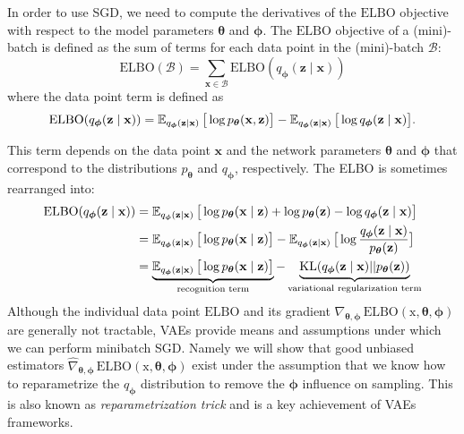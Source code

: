 In order to use SGD, we need to compute the derivatives of the $\mathrm{ELBO}$ objective with respect to the model parameters ${\boldsymbol{\theta}}$ and ${\boldsymbol{\phi}}$. 
The $\mathrm{ELBO}$ objective of a (mini)-batch is defined as the sum of terms for each data point in the (mini)-batch $\mathcal{B}$:
$$
\mathrm{ELBO}(\mathcal{B}) = \sum_{\mathbf{x} \in \mathcal{B}} \mathrm{ELBO}(q_{\boldsymbol{\phi}}(\mathbf{z}\mid \mathbf{x}))
$$
where the data point term is defined as
$$
\mathrm{ELBO}(q_{\boldsymbol{\phi}}(\mathbf{z}\mid \mathbf{x})) = \operatorname{\mathbb{E}}_{q_{\boldsymbol{\phi}}(\mathbf{z}\mid \mathbf{x})} \big[\log p_{\boldsymbol{\theta}}(\mathbf{x},\mathbf{z})\big] - \operatorname{\mathbb{E}}_{q_{\boldsymbol{\phi}}(\mathbf{z}\mid \mathbf{x})} \big[\log q_{\boldsymbol{\phi}}(\mathbf{z}\mid \mathbf{x})\big].
$$

This term depends on the data point $\mathbf{x}$ and the network parameters ${\boldsymbol{\theta}}$ and ${\boldsymbol{\phi}}$ that correspond to the distributions $p_{\boldsymbol{\theta}}$ and $q_{\boldsymbol{\phi}}$, respectively.
The ELBO is sometimes rearranged into:
\begin{align}
    \mathrm{ELBO}(q_{\boldsymbol{\phi}}(\mathbf{z}\mid \mathbf{x})) &= \operatorname{\mathbb{E}}_{q_{\boldsymbol{\phi}}(\mathbf{z}\mid \mathbf{x})} \big[\log p_{\boldsymbol{\theta}}(\mathbf{x}\mid \mathbf{z}) + \log p_{\boldsymbol{\theta}}(\mathbf{z}) - \log q_{\boldsymbol{\phi}}(\mathbf{z}\mid\mathbf{x})\big] \notag\\
    &= \operatorname{\mathbb{E}}_{q_{\boldsymbol{\phi}}(\mathbf{z}\mid\mathbf{x})} \big[\log p_{\boldsymbol{\theta}}(\mathbf{x}\mid\mathbf{z}) \big] - \operatorname{\mathbb{E}}_{q_{\boldsymbol{\phi}}(\mathbf{z}\mid\mathbf{x})} \big[  \log \frac{q_{\boldsymbol{\phi}}(\mathbf{z}\mid\mathbf{x})}{p_{\boldsymbol{\theta}}(\mathbf{z})} \big] \notag\\
    &= \underbrace{\operatorname{\mathbb{E}}_{q_{\boldsymbol{\phi}}(\mathbf{z}\mid\mathbf{x})} \big[\log p_{\boldsymbol{\theta}}(\mathbf{x}\mid\mathbf{z}) \big]}_{\text{recognition term}} - \underbrace{\mathrm{KL}(q_{\boldsymbol{\phi}}(\mathbf{z}\mid\mathbf{x}) ||p_{\boldsymbol{\theta}}(\mathbf{z}))}_{\text{variational regularization term}} \label{eq:elbo_terms}
\end{align}
Although the individual data point $\mathrm{ELBO}$ and its gradient $\nabla_{{\boldsymbol{\theta}},{\boldsymbol{\phi}}}\,\mathrm{ELBO}(\mathrm{x},{\boldsymbol{\theta}},{\boldsymbol{\phi}})$ are generally not tractable, VAEs provide
means and assumptions under which we can perform minibatch SGD. Namely we will show that good unbiased estimators $\hat{\nabla}_{{\boldsymbol{\theta}},{\boldsymbol{\phi}}}\,\mathrm{ELBO}(\mathrm{x},{\boldsymbol{\theta}},{\boldsymbol{\phi}})$ 
exist under the assumption that we know how to reparametrize the $q_{\boldsymbol{\phi}}$ distribution to remove the ${\boldsymbol{\phi}}$ influence on sampling. This is also known as \textit{reparametrization trick} and 
is a key achievement of VAEs frameworks.

